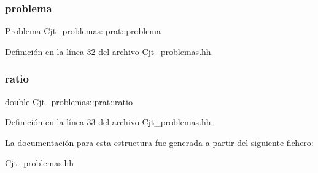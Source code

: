 \subsubsection{\texorpdfstring{problema}{problema}}
{\footnotesize\ttfamily \mbox{\hyperlink{class_problema}{Problema}} Cjt\+\_\+problemas\+::prat\+::problema}



Definición en la línea 32 del archivo Cjt\+\_\+problemas.\+hh.

\mbox{\label{struct_cjt__problemas_1_1prat_abc19a891cf42bf745b1d0e9736e7ca80}} 
\subsubsection{\texorpdfstring{ratio}{ratio}}
{\footnotesize\ttfamily double Cjt\+\_\+problemas\+::prat\+::ratio}



Definición en la línea 33 del archivo Cjt\+\_\+problemas.\+hh.



La documentación para esta estructura fue generada a partir del siguiente fichero\+:\begin{DoxyCompactItemize}
\item 
\mbox{\hyperlink{_cjt__problemas_8hh}{Cjt\+\_\+problemas.\+hh}}\end{DoxyCompactItemize}
